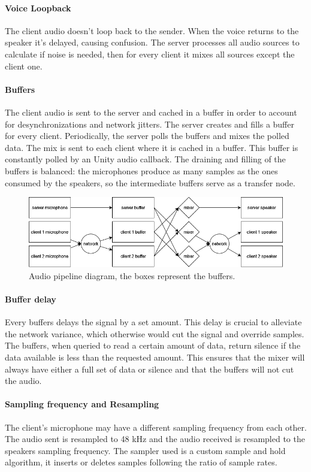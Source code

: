 \documentclass[12pt]{article}
\begin{document}
\paragraph{Voice Loopback}
The client audio doesn't loop back to the sender. When the voice returns to the speaker it's delayed, causing confusion. The server processes all audio sources to calculate if noise is needed, then for every client it mixes all sources except the client one.
\paragraph{Buffers}
The client audio is sent to the server and cached in a buffer in order to account for desynchronizations and network jitters. The server creates and fills a buffer for every client. Periodically, the server polls the buffers and mixes the polled data. The mix is sent to each client where it is cached in a buffer. This buffer is constantly polled by an Unity audio callback. The draining and filling of the buffers is balanced: the microphones produce as many samples as the ones consumed by the speakers, so the intermediate buffers serve as a transfer node. 

\begin{figure}[H]
\includegraphics[width=\textwidth]{audio_mixer}
\caption{Audio pipeline diagram, the boxes represent the buffers.}
\end{figure}

\paragraph{Buffer delay}
Every buffers delays the signal by a set amount. This delay is crucial to alleviate the network variance, which otherwise would cut the signal and override samples. The buffers, when queried to read a certain amount of data, return silence if the data available is less than the requested amount. This ensures that the mixer will always have either a full set of data or silence and that the buffers will not cut the audio.

\clearpage

\paragraph{Sampling frequency and Resampling}
The client's microphone may have a different sampling frequency from each other. The audio sent is resampled to 48 kHz and the audio received is resampled to the speakers sampling frequency. The sampler used is a custom sample and hold algorithm, it inserts or deletes samples following the ratio of sample rates.
\end{document}
